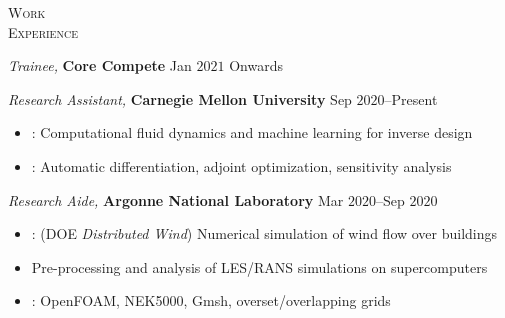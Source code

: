 \documentclass[10pt]{article}
\begin{document}
\vspace{-1.5em}
\begin{multicols}{2}
\textsc{Work \\ Experience}
\columnbreak

\textit{Trainee,} \textbf{Core Compete} \hfill Jan $2021$ Onwards

\vspace{-0.75em}
%
%
\textit{Research Assistant,} \textbf{Carnegie Mellon University} \hfill Sep $2020$--Present

\vspace{-1.75em}
\begin{itemize}[label=-]
    \setlength\itemsep{-0.25em}
    \setlength{\itemindent}{-1.50em}
    \item {}: Computational fluid dynamics and machine learning for inverse design
    \item {}: Automatic differentiation, adjoint optimization, sensitivity analysis
\end{itemize}
\vspace{-2.0em}

\vspace{0.5em}
%
\textit{Research Aide,} \textbf{Argonne National Laboratory} \hfill Mar $2020$--Sep $2020$

\vspace{-1.75em}
\begin{itemize}[label=-]
    \setlength\itemsep{-0.25em}
    \setlength{\itemindent}{-1.50em}
    \item {}: (DOE \textit{Distributed Wind}) Numerical simulation of wind flow over buildings
    \item {} Pre-processing and analysis of LES/RANS simulations on supercomputers
    \item {}: OpenFOAM, NEK5000, Gmsh, overset/overlapping grids
\end{itemize}
\vspace{-2.0em}


\end{multicols}
\end{document}
